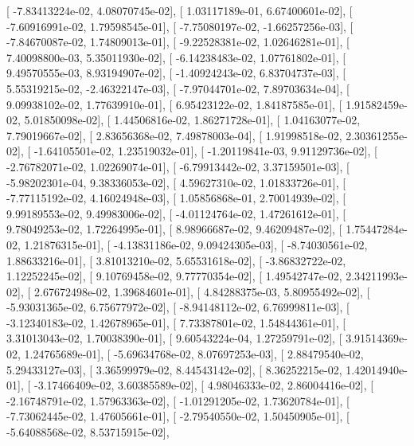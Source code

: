 \documentclass{article}
\begin{document}
       [ -7.83413224e-02,   4.08070745e-02],
       [  1.03117189e-01,   6.67400601e-02],
       [ -7.60916991e-02,   1.79598545e-01],
       [ -7.75080197e-02,  -1.66257256e-03],
       [ -7.84670087e-02,   1.74809013e-01],
       [ -9.22528381e-02,   1.02646281e-01],
       [  7.40098800e-03,   5.35011930e-02],
       [ -6.14238483e-02,   1.07761802e-01],
       [  9.49570555e-03,   8.93194907e-02],
       [ -1.40924243e-02,   6.83704737e-03],
       [  5.55319215e-02,  -2.46322147e-03],
       [ -7.97044701e-02,   7.89703634e-04],
       [  9.09938102e-02,   1.77639910e-01],
       [  6.95423122e-02,   1.84187585e-01],
       [  1.91582459e-02,   5.01850098e-02],
       [  1.44506816e-02,   1.86271728e-01],
       [  1.04163077e-02,   7.79019667e-02],
       [  2.83656368e-02,   7.49878003e-04],
       [  1.91998518e-02,   2.30361255e-02],
       [ -1.64105501e-02,   1.23519032e-01],
       [ -1.20119841e-03,   9.91129736e-02],
       [ -2.76782071e-02,   1.02269074e-01],
       [ -6.79913442e-02,   3.37159501e-03],
       [ -5.98202301e-04,   9.38336053e-02],
       [  4.59627310e-02,   1.01833726e-01],
       [ -7.77115192e-02,   4.16024948e-03],
       [  1.05856868e-01,   2.70014939e-02],
       [  9.99189553e-02,   9.49983006e-02],
       [ -4.01124764e-02,   1.47261612e-01],
       [  9.78049253e-02,   1.72264995e-01],
       [  8.98966687e-02,   9.46209487e-02],
       [  1.75447284e-02,   1.21876315e-01],
       [ -4.13831186e-02,   9.09424305e-03],
       [ -8.74030561e-02,   1.88633216e-01],
       [  3.81013210e-02,   5.65531618e-02],
       [ -3.86832722e-02,   1.12252245e-02],
       [  9.10769458e-02,   9.77770354e-02],
       [  1.49542747e-02,   2.34211993e-02],
       [  2.67672498e-02,   1.39684601e-01],
       [  4.84288375e-03,   5.80955492e-02],
       [ -5.93031365e-02,   6.75677972e-02],
       [ -8.94148112e-02,   6.76999811e-03],
       [ -3.12340183e-02,   1.42678965e-01],
       [  7.73387801e-02,   1.54844361e-01],
       [  3.31013043e-02,   1.70038390e-01],
       [  9.60543224e-04,   1.27259791e-02],
       [  3.91514369e-02,   1.24765689e-01],
       [ -5.69634768e-02,   8.07697253e-03],
       [  2.88479540e-02,   5.29433127e-03],
       [  3.36599979e-02,   8.44543142e-02],
       [  8.36252215e-02,   1.42014940e-01],
       [ -3.17466409e-02,   3.60385589e-02],
       [  4.98046333e-02,   2.86004416e-02],
       [ -2.16748791e-02,   1.57963363e-02],
       [ -1.01291205e-02,   1.73620784e-01],
       [ -7.73062445e-02,   1.47605661e-01],
       [ -2.79540550e-02,   1.50450905e-01],
       [ -5.64088568e-02,   8.53715915e-02],
\end{document}
